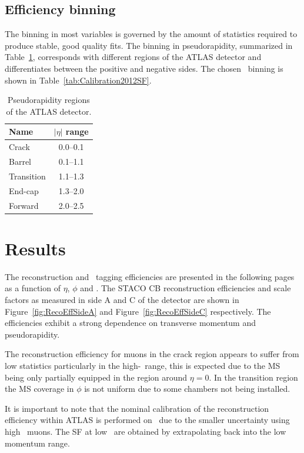 \subsection{Efficiency binning}
The binning in most variables is governed by the amount of statistics required to produce stable, good quality fits. The binning in pseudorapidity, summarized in Table~\ref{tab:CalibrationEtaRegions}, corresponds with different regions of the ATLAS detector and differentiates between the positive and negative sides. The chosen \pt\ binning is shown in Table~\ref{tab:Calibration2012SF}.

\begin{table}[thbp]
  \centering
  \begin{tabular}{@{}lc@{}}
    \toprule
    Name       & $|\eta|$ range \\
    \midrule
    Crack      & \numrange{0.0}{0.1} \\
    Barrel     & \numrange{0.1}{1.1} \\
    Transition & \numrange{1.1}{1.3} \\
    End-cap    & \numrange{1.3}{2.0} \\
    Forward    & \numrange{2.0}{2.5} \\
    \bottomrule
  \end{tabular}
  \caption{Pseudorapidity regions of the ATLAS detector.} \label{tab:CalibrationEtaRegions}
\end{table}

\section{Results}

The reconstruction and \xsm\ tagging efficiencies are presented in the following pages as a function of $\eta$, $\phi$ and \pt. The STACO CB reconstruction efficiencies and scale factors as measured in side A and C of the detector are shown in Figure~\ref{fig:RecoEffSideA} and Figure~\ref{fig:RecoEffSideC} respectively. The efficiencies exhibit a strong dependence on transverse momentum and pseudorapidity.

The reconstruction efficiency for muons in the crack region appears to suffer from low statistics particularly in the high-\pt\ range, this is expected due to the MS being only partially equipped in the region around $\eta=0$. In the transition region the MS coverage in $\phi$ is not uniform due to some chambers not being installed.

It is important to note that the nominal calibration of the reconstruction efficiency within ATLAS is performed on \ZMu\ due to the smaller uncertainty using high \pt\ muons. The SF at low \pt\ are obtained by extrapolating back into the low momentum range.

